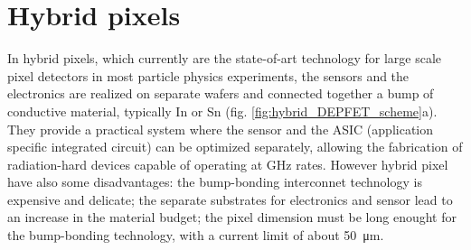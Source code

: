 \section{Hybrid pixels}
   In hybrid pixels, which currently are the state-of-art technology for large scale pixel detectors in most particle physics experiments, the sensors and the electronics are realized on separate wafers and connected together a bump of conductive material, typically In or Sn  (fig. \ref{fig:hybrid_DEPFET_scheme}a). 
   They provide a practical system where the sensor and the ASIC (application specific integrated circuit) can be optimized separately, allowing the fabrication of radiation-hard devices capable of operating at \si{GHz} rates.
   However hybrid pixel have also some disadvantages: the bump-bonding interconnet technology is expensive and delicate; the separate substrates for electronics and sensor lead to an increase in the material budget; the pixel dimension must be long enought for the bump-bonding technology, with a current limit of about \SI{50}{\um}.

